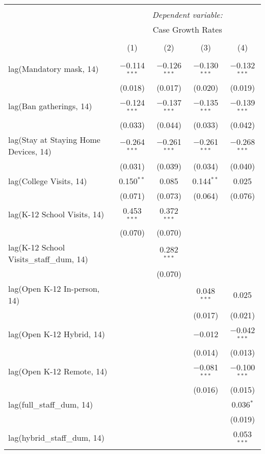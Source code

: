 \begin{tabular}{@{\extracolsep{1pt}}lcccc} 
\\[-1.8ex]\hline 
\hline \\[-1.8ex] 
 & \multicolumn{4}{c}{\textit{Dependent variable:}} \\ 
\cline{2-5} 
 & \multicolumn{4}{c}{Case Growth Rates} \\ 
\\[-1.8ex] & (1) & (2) & (3) & (4)\\ 
\hline \\[-1.8ex] 
 lag(Mandatory mask, 14) & $-$0.114$^{***}$ & $-$0.126$^{***}$ & $-$0.130$^{***}$ & $-$0.132$^{***}$ \\ 
  & (0.018) & (0.017) & (0.020) & (0.019) \\ 
  lag(Ban gatherings, 14) & $-$0.124$^{***}$ & $-$0.137$^{***}$ & $-$0.135$^{***}$ & $-$0.139$^{***}$ \\ 
  & (0.033) & (0.044) & (0.033) & (0.042) \\ 
  lag(Stay at Staying Home Devices, 14) & $-$0.264$^{***}$ & $-$0.261$^{***}$ & $-$0.261$^{***}$ & $-$0.268$^{***}$ \\ 
  & (0.031) & (0.039) & (0.034) & (0.040) \\ 
  lag(College Visits, 14) & 0.150$^{**}$ & 0.085 & 0.144$^{**}$ & 0.025 \\ 
  & (0.071) & (0.073) & (0.064) & (0.076) \\ 
  lag(K-12 School Visits, 14) & 0.453$^{***}$ & 0.372$^{***}$ &  &  \\ 
  & (0.070) & (0.070) &  &  \\ 
  lag(K-12 School Visits\_staff\_dum, 14) &  & 0.282$^{***}$ &  &  \\ 
  &  & (0.070) &  &  \\ 
  lag(Open K-12 In-person, 14) &  &  & 0.048$^{***}$ & 0.025 \\ 
  &  &  & (0.017) & (0.021) \\ 
  lag(Open K-12 Hybrid, 14) &  &  & $-$0.012 & $-$0.042$^{***}$ \\ 
  &  &  & (0.014) & (0.013) \\ 
  lag(Open K-12 Remote, 14) &  &  & $-$0.081$^{***}$ & $-$0.100$^{***}$ \\ 
  &  &  & (0.016) & (0.015) \\ 
  lag(full\_staff\_dum, 14) &  &  &  & 0.036$^{*}$ \\ 
  &  &  &  & (0.019) \\ 
  lag(hybrid\_staff\_dum, 14) &  &  &  & 0.053$^{***}$ \\ 

\end{tabular}
